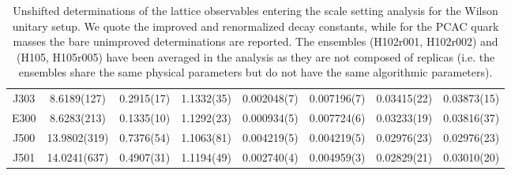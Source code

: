 \begin{sidewaystable}
\begin{center}
\begin{tabular}{c c c c c c c c}
J303 & 8.6189(127) & 0.2915(17) & 1.1332(35) & 0.002048(7) & 0.007196(7) & 0.03415(22) & 0.03873(15) \\
E300 & 8.6283(213) & 0.1335(10) & 1.1292(23) & 0.000934(5) & 0.007724(6) & 0.03233(19) & 0.03816(37) \\
\midrule
J500 & 13.9802(319) & 0.7376(54) & 1.1063(81) & 0.004219(5) & 0.004219(5) & 0.02976(23) & 0.02976(23) \\
J501 & 14.0241(637) & 0.4907(31) & 1.1194(49) & 0.002740(4) & 0.004959(3) & 0.02829(21) & 0.03010(20) \\
\bottomrule
    \end{tabular}
    \end{center}
    \caption{Unshifted determinations of the lattice observables entering the scale setting analysis for the Wilson unitary setup. We quote the improved and renormalized decay constants, while for the PCAC quark masses the bare unimproved determinations are reported. The ensembles (H102r001, H102r002) and (H105, H105r005) have been averaged in the analysis as they are not composed of replicas (i.e. the ensembles share the same physical parameters but do not have the same algorithmic parameters).}
\label{apex_ensembles:tab:obs_w}
\end{sidewaystable}

\newpage

